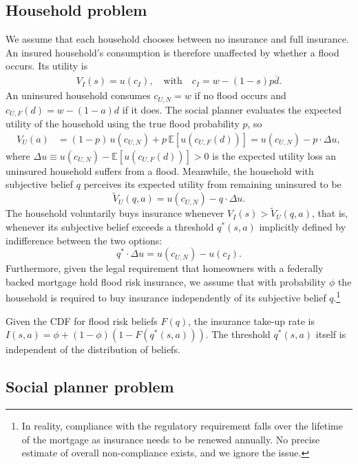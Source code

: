 \documentclass[12pt]{article}
\begin{document}
\subsection{Household problem}

We assume that each household chooses between no insurance and full insurance. An insured household's consumption is therefore unaffected by whether a flood occurs. Its utility is
\begin{align}
    V_I(s) = u(c_I), \quad \text{with} \quad c_I = w - (1-s)p\overline{d}.
\end{align}
An uninsured household consumes $c_{U,N} = w$ if no flood occurs and $c_{U,F}(d) = w-(1-a)d$ if it does. The social planner evaluates the expected utility of the household using the true flood probability $p$, so
\begin{align}
    V_U(a) &= (1-p)\,u(c_{U,N}) + p\,\mathbb{E}[u(c_{U,F}(d))] = u(c_{U,N}) - p\cdot\Delta u,
\end{align}
where $\Delta u \equiv u(c_{U,N})-\mathbb{E}[u(c_{U,F}(d))]>0$ is the expected utility loss an uninsured household suffers from a flood. Meanwhile, the household with subjective belief $q$ perceives its expected utility from remaining uninsured to be
\begin{equation}
    \tilde{V}_U(q,a) = u(c_{U,N}) - q\cdot\Delta u.
\end{equation}
The household voluntarily buys insurance whenever $V_I(s) > \tilde{V}_U(q,a)$, that is, whenever its subjective belief exceeds a threshold $q^*(s,a)$ implicitly defined by indifference between the two options:
\begin{equation}
    q^*\cdot\Delta u = u(c_{U,N}) - u(c_I). \label{eq:qstar_prog}
\end{equation}
Furthermore, given the legal requirement that homeowners with a federally backed mortgage hold flood risk insurance, we assume that with probability $\phi$ the household is required to buy insurance independently of its subjective belief $q$.\footnote{In reality, compliance with the regulatory requirement falls over the lifetime of the mortgage as insurance needs to be renewed annually. No precise estimate of overall non-compliance exists, and we ignore the issue.}  

Given the CDF for flood risk beliefs $F(q)$, the insurance take-up rate is $I(s,a) = \phi+(1-\phi)(1-F(q^*(s,a)))$. The threshold $q^*(s,a)$ itself is independent of the distribution of beliefs.

\subsection{Social planner problem}
\end{document}
